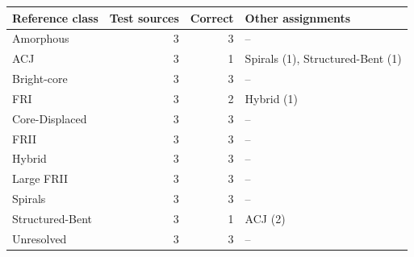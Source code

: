 \begin{tabular}{@{}lrrl@{}}
\toprule
Reference class & Test sources & Correct & Other assignments \\
\midrule
Amorphous & 3 & 3 & -- \\
ACJ & 3 & 1 & Spirals (1), Structured-Bent (1) \\
Bright-core & 3 & 3 & -- \\
FRI & 3 & 2 & Hybrid (1) \\
Core-Displaced & 3 & 3 & -- \\
FRII & 3 & 3 & -- \\
Hybrid & 3 & 3 & -- \\
Large FRII & 3 & 3 & -- \\
Spirals & 3 & 3 & -- \\
Structured-Bent & 3 & 1 & ACJ (2) \\
Unresolved & 3 & 3 & -- \\
\bottomrule
\end{tabular}
